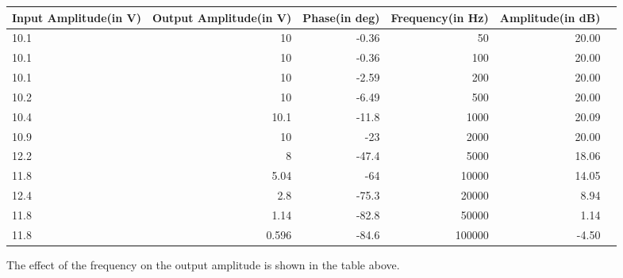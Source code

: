 \begin{adjustwidth}{-2.5 cm}{-2.5 cm}\centering\begin{threeparttable}[!htb]
        \scriptsize
        \begin{tabular}{lrrrrr}\toprule
            \textbf{Input Amplitude(in V)} & \textbf{Output Amplitude(in V)} & \textbf{Phase(in deg)} & \textbf{Frequency(in Hz)} & \textbf{Amplitude(in dB)} \\\midrule
            10.1                           & 10                              & -0.36                  & 50                        & 20.00                     \\
            10.1                           & 10                              & -0.36                  & 100                       & 20.00                     \\
            10.1                           & 10                              & -2.59                  & 200                       & 20.00                     \\
            10.2                           & 10                              & -6.49                  & 500                       & 20.00                     \\
            10.4                           & 10.1                            & -11.8                  & 1000                      & 20.09                     \\
            10.9                           & 10                              & -23                    & 2000                      & 20.00                     \\
            12.2                           & 8                               & -47.4                  & 5000                      & 18.06                     \\
            11.8                           & 5.04                            & -64                    & 10000                     & 14.05                     \\
            12.4                           & 2.8                             & -75.3                  & 20000                     & 8.94                      \\
            11.8                           & 1.14                            & -82.8                  & 50000                     & 1.14                      \\
            11.8                           & 0.596                           & -84.6                  & 100000                    & -4.50                     \\
            \bottomrule
        \end{tabular}
        \caption{The effect of the frequency on the output amplitude is shown in the table above.}\label{tab: }
    \end{threeparttable}\end{adjustwidth}